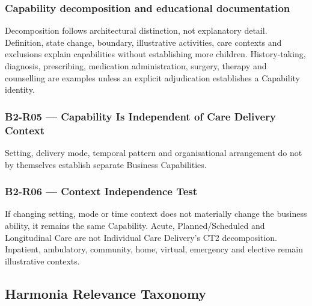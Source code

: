\subsubsection*{Capability decomposition and educational documentation}
\label{rad:business:73}

Decomposition follows architectural distinction, not explanatory detail. Definition, state change, boundary, illustrative activities, care contexts and exclusions explain capabilities without establishing more children. History-taking, diagnosis, prescribing, medication administration, surgery, therapy and counselling are examples unless an explicit adjudication establishes a Capability identity.

\label{rad:business:79}



\label{rad:business:81}
\subsubsection*{B2-R05 — Capability Is Independent of Care Delivery Context}
\label{rad:business:83}

Setting, delivery mode, temporal pattern and organisational arrangement do not by themselves establish separate Business Capabilities.

\label{rad:business:86}



\label{rad:business:88}
\subsubsection*{B2-R06 — Context Independence Test}
\label{rad:business:90}

If changing setting, mode or time context does not materially change the business ability, it remains the same Capability. Acute, Planned/\allowbreak{}Scheduled and Longitudinal Care are not Individual Care Delivery's CT2 decomposition. Inpatient, ambulatory, community, home, virtual, emergency and elective remain illustrative contexts.

\label{rad:business:95}
\subsection*{Harmonia Relevance Taxonomy}
\label{rad:business:97}



